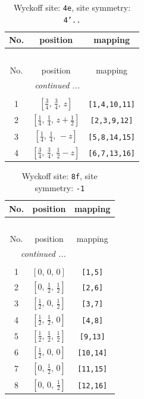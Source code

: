 \documentclass[fleqn,8pt]{jsarticle}
\begin{document}
\renewcommand{\arraystretch}{1.2}
\begin{longtable}{ccc}
\caption{Wyckoff site: {\tt 4e}, site symmetry: {\tt 4'..}}
 \\
 \hline \hline
No. & position & mapping \\ \hline \endfirsthead

\multicolumn{2}{l}{\tablename\ \thetable{}} \\
 \hline \hline
No. & position & mapping \\ \hline \endhead

 \hline \hline
\multicolumn{2}{r}{\footnotesize\it continued ...} \\ \endfoot

 \hline \hline
\multicolumn{2}{r}{} \\ \endlastfoot

1 & $\left[ \frac{3}{4},\, \frac{3}{4},\, z \right]$ & {\tt [1,4,10,11]} \\ \hline
2 & $\left[ \frac{1}{4},\, \frac{1}{4},\, z + \frac{1}{2} \right]$ & {\tt [2,3,9,12]} \\ \hline
3 & $\left[ \frac{1}{4},\, \frac{1}{4},\, - z \right]$ & {\tt [5,8,14,15]} \\ \hline
4 & $\left[ \frac{3}{4},\, \frac{3}{4},\, \frac{1}{2} - z \right]$ & {\tt [6,7,13,16]} \\
\end{longtable}
\renewcommand{\arraystretch}{1.2}
\begin{longtable}{ccc}
\caption{Wyckoff site: {\tt 8f}, site symmetry: {\tt -1}}
 \\
 \hline \hline
No. & position & mapping \\ \hline \endfirsthead

\multicolumn{2}{l}{\tablename\ \thetable{}} \\
 \hline \hline
No. & position & mapping \\ \hline \endhead

 \hline \hline
\multicolumn{2}{r}{\footnotesize\it continued ...} \\ \endfoot

 \hline \hline
\multicolumn{2}{r}{} \\ \endlastfoot

1 & $\left[ 0,\, 0,\, 0 \right]$ & {\tt [1,5]} \\ \hline
2 & $\left[ 0,\, \frac{1}{2},\, \frac{1}{2} \right]$ & {\tt [2,6]} \\ \hline
3 & $\left[ \frac{1}{2},\, 0,\, \frac{1}{2} \right]$ & {\tt [3,7]} \\ \hline
4 & $\left[ \frac{1}{2},\, \frac{1}{2},\, 0 \right]$ & {\tt [4,8]} \\ \hline
5 & $\left[ \frac{1}{2},\, \frac{1}{2},\, \frac{1}{2} \right]$ & {\tt [9,13]} \\ \hline
6 & $\left[ \frac{1}{2},\, 0,\, 0 \right]$ & {\tt [10,14]} \\ \hline
7 & $\left[ 0,\, \frac{1}{2},\, 0 \right]$ & {\tt [11,15]} \\ \hline
8 & $\left[ 0,\, 0,\, \frac{1}{2} \right]$ & {\tt [12,16]} \\
\end{longtable}
\end{document}
